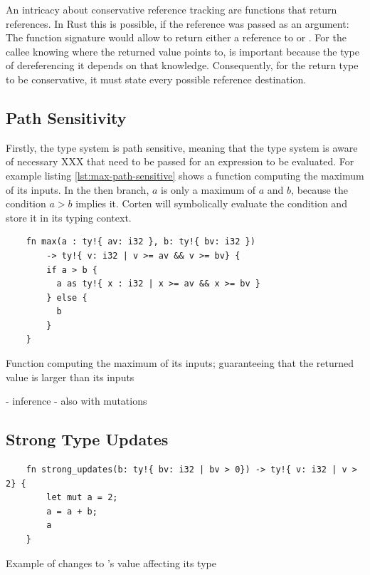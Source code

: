 \documentclass[twoside, english]{sdqthesis}
\theoremstyle{definition}
\begin{document}
An intricacy about conservative reference tracking are functions that return references. In Rust this is possible, if the reference was passed as an argument: The function signature  would allow  to return either a reference to  or . For the callee knowing where the returned value points to, is important because the type of dereferencing it depends on that knowledge. Consequently, for the return type to be conservative, it must state every possible reference destination.


\label{subsec:path-sensitivify}\subsection{Path Sensitivity}

Firstly, the type system is path sensitive, meaning that the type system is aware of necessary XXX that need to be passed for an expression to be evaluated. For example listing \ref{lst:max-path-sensitive} shows a function computing the maximum of its inputs. In the then branch, $a$ is only a maximum of $a$ and $b$, because the condition $a > b$ implies it. Corten will symbolically evaluate the condition and store it in its typing context.

\begin{listing}[ht]
  \begin{verbatim}
    fn max(a : ty!{ av: i32 }, b: ty!{ bv: i32 })
        -> ty!{ v: i32 | v >= av && v >= bv} {
        if a > b {
          a as ty!{ x : i32 | x >= av && x >= bv }
        } else {
          b
        }
    }
  \end{verbatim}
  \caption{Function computing the maximum of its inputs; guaranteeing that the returned value is larger than its inputs}
  \label{lst:max-path-sensitive}
\end{listing}


- inference
- also with mutations


\subsection{Strong Type Updates}\label{subsec:strong-type-updates}

\begin{listing}[ht]
  \begin{verbatim}
    fn strong_updates(b: ty!{ bv: i32 | bv > 0}) -> ty!{ v: i32 | v > 2} {
        let mut a = 2;
        a = a + b;
        a
    }
  \end{verbatim}
  \caption{Example of changes to 's value affecting its type}
  \label{lst:strong-updates}
\end{listing}
\end{document}
